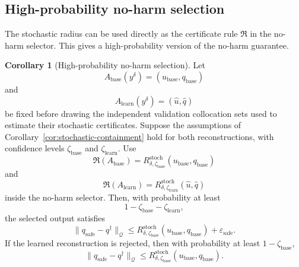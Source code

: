\documentclass{article}
\numberwithin{equation}{section}
\theoremstyle{definition}
\newtheorem{corollary}{Corollary}
\begin{document}
\subsection{High-probability no-harm selection}

The stochastic radius can be used directly as the certificate rule \(\mathfrak R\) in the no-harm selector. This gives a high-probability version of the no-harm guarantee.

\begin{corollary}[High-probability no-harm selection]
\label{cor:stochastic-no-harm-selection}
Let
\[
A_{\mathrm{base}}(y^\delta)
=
(u_{\mathrm{base}},q_{\mathrm{base}})
\]
and
\[
A_{\mathrm{learn}}(y^\delta)
=
(\widehat u,\widehat q)
\]
be fixed before drawing the independent validation collocation sets used to estimate their stochastic certificates. Suppose the assumptions of Corollary~\ref{cor:stochastic-containment} hold for both reconstructions, with confidence levels \(\zeta_{\mathrm{base}}\) and \(\zeta_{\mathrm{learn}}\). Use
\begin{equation}
\mathfrak R(A_{\mathrm{base}})
=
R_{\delta,\zeta_{\mathrm{base}}}^{\mathrm{stoch}}(u_{\mathrm{base}},q_{\mathrm{base}})
\label{eq:baseline-stoch-certificate}
\end{equation}
and
\begin{equation}
\mathfrak R(A_{\mathrm{learn}})
=
R_{\delta,\zeta_{\mathrm{learn}}}^{\mathrm{stoch}}(\widehat u,\widehat q)
\label{eq:learned-stoch-certificate}
\end{equation}
inside the no-harm selector. Then, with probability at least
\[
1-\zeta_{\mathrm{base}}-\zeta_{\mathrm{learn}},
\]
the selected output satisfies
\begin{equation}
\|q_{\mathrm{safe}}-q^\dagger\|_{\mathcal Q}
\le
R_{\delta,\zeta_{\mathrm{base}}}^{\mathrm{stoch}}(u_{\mathrm{base}},q_{\mathrm{base}})
+
\varepsilon_{\mathrm{safe}}.
\label{eq:stochastic-no-harm-selection}
\end{equation}
If the learned reconstruction is rejected, then with probability at least \(1-\zeta_{\mathrm{base}}\),
\begin{equation}
\|q_{\mathrm{safe}}-q^\dagger\|_{\mathcal Q}
\le
R_{\delta,\zeta_{\mathrm{base}}}^{\mathrm{stoch}}(u_{\mathrm{base}},q_{\mathrm{base}}).
\label{eq:stochastic-rejected-baseline}
\end{equation}
\end{corollary}
\end{document}
